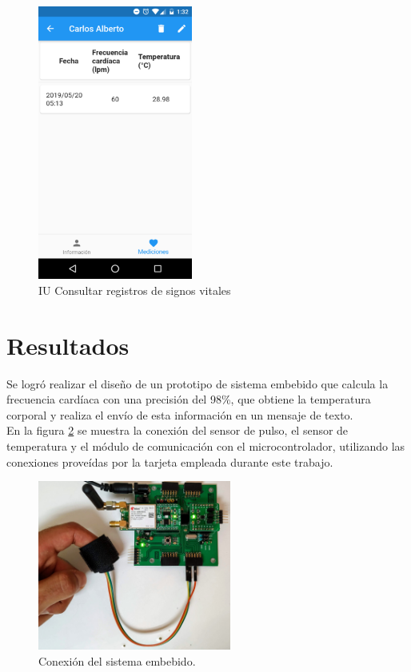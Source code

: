 \documentclass[journal]{IEEEtran}
\begin{document}
\begin{figure}[htpb!]
	\begin{center}
		\includegraphics[width=2in]{AvancesPruebas/imagenes/app/ui_medicion.png}
		\caption{IU Consultar registros de signos vitales}
		\label{fig:casosUso:resumenUI5}
	\end{center}
\end{figure}

\section{Resultados}
Se logró realizar el diseño de un prototipo de sistema embebido que calcula la frecuencia cardíaca con una precisión del 98\%, que obtiene la temperatura corporal y realiza el envío de esta información en un mensaje de texto. \\

En la figura \ref{fig:integracion} se muestra la conexión del sensor de pulso, el sensor de temperatura y el módulo de comunicación con el microcontrolador, utilizando las conexiones proveídas por la tarjeta empleada durante este trabajo. \\

\begin{figure}[htbp!]
	\centering
	\includegraphics[width=2.5in]{AvancesPruebas/imagenes/integracion.jpg}
	\caption{Conexión del sistema embebido.}
	\label{fig:integracion}
\end{figure}
\end{document}
